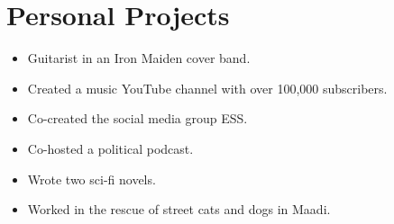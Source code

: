 \documentclass[10pt, letterpaper]{article}
\begin{document}
\section{Personal Projects}
\vspace{-1ex}
\begin{itemize}[leftmargin=*, itemsep=0.5ex]
    \item Guitarist in an Iron Maiden cover band.
    \item Created a music YouTube channel with over 100,000 subscribers.
    \item Co-created the social media group ESS.
    \item Co-hosted a political podcast.
    \item Wrote two sci-fi novels.
    \item Worked in the rescue of street cats and dogs in Maadi.
\end{itemize}
\end{document}

